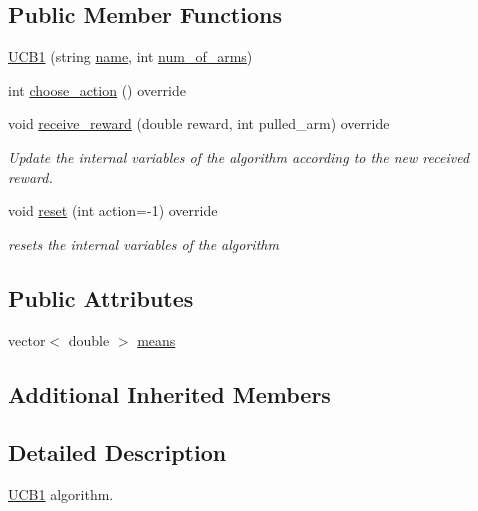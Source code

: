 \subsection*{Public Member Functions}
\begin{DoxyCompactItemize}
\item 
\mbox{\hyperlink{class_u_c_b1_a063ccddba0179d29086913d9c61c330b}{U\+C\+B1}} (string \mbox{\hyperlink{class_m_a_b_algorithm_a77b10ecc4b49d519c557f65358167b82}{name}}, int \mbox{\hyperlink{class_m_a_b_algorithm_a340fa9e83e85b092f2c6125fc4e8549b}{num\+\_\+of\+\_\+arms}})
\item 
int \mbox{\hyperlink{class_u_c_b1_ac71b279c529fdcca156e984550ad3ed3}{choose\+\_\+action}} () override
\item 
void \mbox{\hyperlink{class_u_c_b1_a79106e98a38550c3f1f03e10f72226c6}{receive\+\_\+reward}} (double reward, int pulled\+\_\+arm) override
\begin{DoxyCompactList}\small\item\em Update the internal variables of the algorithm according to the new received reward. \end{DoxyCompactList}\item 
void \mbox{\hyperlink{class_u_c_b1_aa426545f69a7e168ffcdcc3c9e8cd490}{reset}} (int action=-\/1) override
\begin{DoxyCompactList}\small\item\em resets the internal variables of the algorithm \end{DoxyCompactList}\end{DoxyCompactItemize}
\subsection*{Public Attributes}
\begin{DoxyCompactItemize}
\item 
vector$<$ double $>$ \mbox{\hyperlink{class_u_c_b1_ad183f1a1841c9bcb54a82c7b92503a14}{means}}
\end{DoxyCompactItemize}
\subsection*{Additional Inherited Members}


\subsection{Detailed Description}
\mbox{\hyperlink{class_u_c_b1}{U\+C\+B1}} algorithm. 


